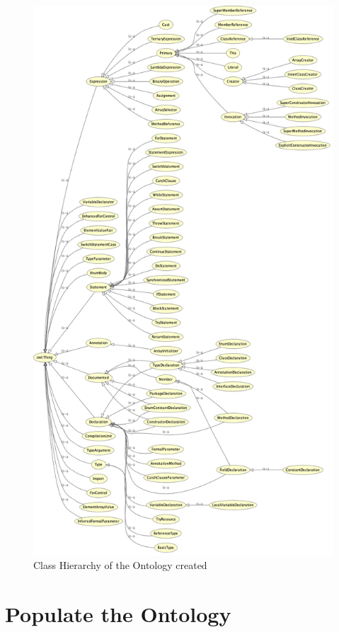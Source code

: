 \documentclass [14 pt]{article}
\begin{document}
\begin{figure}[H]
\centering
\includegraphics[height=0.9\textheight]{res/ontology_graph.png}
\caption{Class Hierarchy of the Ontology created}\label{fig:OntoClassGraph}
\end{figure}


\newpage
\section{Populate the Ontology}
\end{document}
